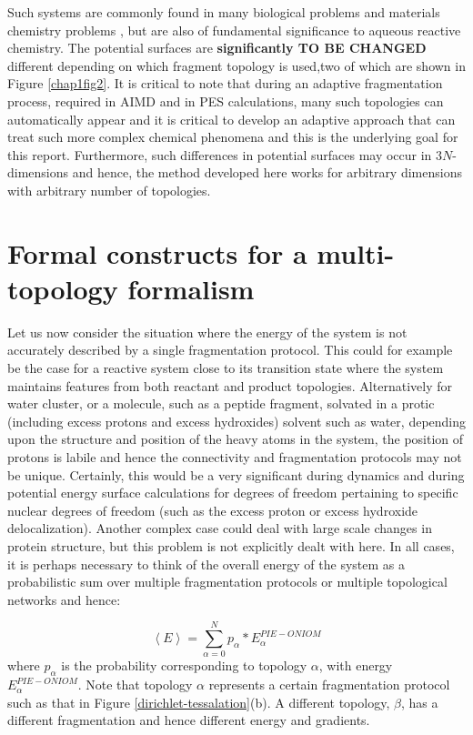 Such systems are commonly found in many biological problems \cite{qmmmadmp,Roux,Sagnella,
Guo,Agre,Takata,Kandori} and materials chemistry problems \cite{mashl2003anomalously,
si2011selective, mann2003water}, but are also of fundamental significance to aqueous
reactive chemistry. The potential surfaces are \textbf{significantly TO BE CHANGED}
different depending
on which fragment topology is used,two of which are shown in Figure \ref{chap1fig2}.
It is critical to note
that during an adaptive fragmentation process, required in AIMD and in PES calculations,
many such topologies can automatically appear and it is critical to develop an adaptive
approach that can treat such more complex chemical phenomena and this is the
underlying goal for this report. Furthermore, such differences in potential surfaces may
occur in $3N$-dimensions and hence, the method developed here works for arbitrary dimensions
with arbitrary number of topologies.

\section{Formal constructs for a multi-topology formalism}
Let us now consider the situation where the energy of the system is not accurately
described by a single fragmentation protocol. This could for example be the case for
a reactive system close to its transition state where the system maintains features
from both reactant and product topologies. Alternatively for water cluster, or a molecule,
such as a peptide fragment, solvated in a protic (including excess protons and excess
hydroxides) solvent such as water, depending upon the structure and position of the
heavy atoms in the system, the position of protons is labile and hence the connectivity
and fragmentation protocols may not be unique. Certainly, this would be a very significant
during dynamics and during potential energy surface calculations for degrees of freedom
pertaining to specific nuclear degrees of freedom (such as the excess proton or excess
hydroxide delocalization). Another complex case could deal with large scale changes in
protein structure, but this problem is not explicitly dealt with here. In all cases, it
is perhaps necessary to think of the overall energy of the system as a probabilistic sum
over multiple fragmentation protocols or multiple topological networks and hence:

\begin{equation}
\left\langle E \right\rangle = \sum_{\alpha=0}^N p_\alpha * E^{PIE-ONIOM}_\alpha
\label{aveE}
\end{equation}
where $p_\alpha$ is the probability corresponding to topology $\alpha$, with energy
$E^{PIE-ONIOM}_\alpha$. Note that topology $\alpha$ represents a certain fragmentation
protocol such as that in Figure \ref{dirichlet-tessalation}(b). A different topology,
$\beta$, has a different fragmentation and hence different energy and gradients. 

